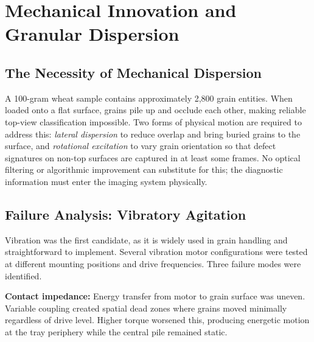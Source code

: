 
\chapter{Mechanical Innovation and Granular Dispersion}\doublespacing
\label{Chapter5}

\section{The Necessity of Mechanical Dispersion}

A 100-gram wheat sample contains approximately 2,800 grain entities. When loaded onto a flat surface, grains pile up and occlude each other, making reliable top-view classification impossible. Two forms of physical motion are required to address this: \textit{lateral dispersion} to reduce overlap and bring buried grains to the surface, and \textit{rotational excitation} to vary grain orientation so that defect signatures on non-top surfaces are captured in at least some frames. No optical filtering or algorithmic improvement can substitute for this; the diagnostic information must enter the imaging system physically.

\section{Failure Analysis: Vibratory Agitation}

Vibration was the first candidate, as it is widely used in grain handling and straightforward to implement. Several vibration motor configurations were tested at different mounting positions and drive frequencies. Three failure modes were identified.

\textbf{Contact impedance:} Energy transfer from motor to grain surface was uneven. Variable coupling created spatial dead zones where grains moved minimally regardless of drive level. Higher torque worsened this, producing energetic motion at the tray periphery while the central pile remained static.

